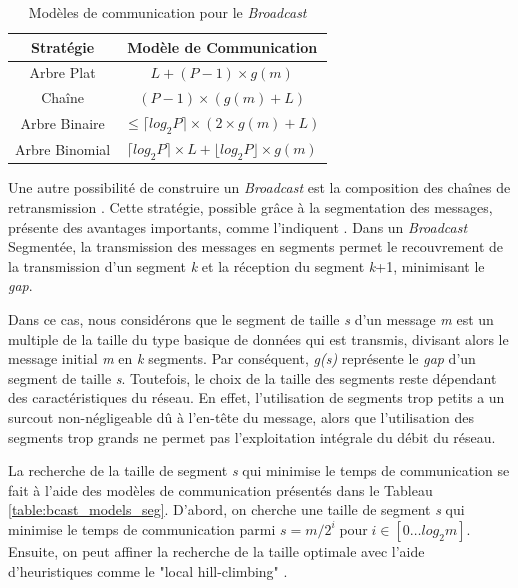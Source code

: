 %
\begin{table}
	\centering
	\begin{tabular}{|c|c|}
		\hline 
		\textbf{\small Stratégie} & \textbf{\small Modèle de Communication}\tabularnewline
		\hline
		\hline 
		{\small Arbre Plat} & {\small $L+(P-1)\times g(m)$}\tabularnewline
		\hline 
		{\small Chaîne} & {\small $(P-1)\times(g(m)+L)$}\tabularnewline
		\hline 
		{\small Arbre Binaire} & {\small $\leq\lceil log_{2}P\rceil\times(2\times g(m)+L)$}\tabularnewline
		\hline 
		{\small Arbre Binomial} & {\small $\lceil log_{2}P\rceil\times L+\lfloor log_{2}P\rfloor\times g(m)$}\tabularnewline
		\hline
	\end{tabular}
	
	
	\caption{\label{table:bcast_models_classique}Modèles de communication pour
		le \emph{Broadcast}}
	
\end{table}


Une autre possibilité de construire un \emph{Broadcast} est la composition
des chaînes de retransmission \cite{Barnett96}. Cette stratégie,
possible grâce à la segmentation des messages, présente des avantages
importants, comme l'indiquent \cite{Kielmann01}\cite{Thakur03}\cite{Beaumont04a}.
Dans un \emph{Broadcast} Segmentée, la transmission des messages en
segments permet le recouvrement de la transmission d'un segment \emph{k}
et la réception du segment \emph{k}+1, minimisant le \emph{gap}.

Dans ce cas, nous considérons que le segment de taille \emph{s} d'un
message \emph{m} est un multiple de la taille du type basique de données
qui est transmis, divisant alors le message initial \emph{m} en \emph{k}
segments. Par conséquent, \emph{g(s)} représente le \emph{gap} d'un
segment de taille \emph{s}. Toutefois, le choix de la taille des segments
reste dépendant des caractéristiques du réseau. En effet, l'utilisation
de segments trop petits a un surcout non-négligeable dû à l'en-tête
du message, alors que l'utilisation des segments trop grands ne permet
pas l'exploitation intégrale du débit du réseau. 

La recherche de la taille de segment \emph{s} qui minimise le temps
de communication se fait à l'aide des modèles de communication présentés
dans le Tableau \ref{table:bcast_models_seg}. D'abord, on cherche
une taille de segment \emph{s} qui minimise le temps de communication
parmi $s=m/2^{i}\;\mathrm{pour}\; i\in[0\ldots log_{2}m]$. Ensuite,
on peut affiner la recherche de la taille optimale avec l'aide d'heuristiques
comme le "local hill-climbing" \cite{Kielmann01}.

